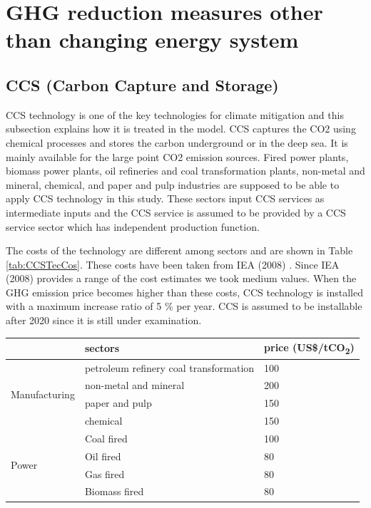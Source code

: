 \documentclass[10pt,a4paper,titlepage,dvipdfmx]{book}
\begin{document}
\section{\label{sec:GHGRedMeaOthThanCHaEneSys}{GHG reduction measures other than changing energy system}}

\subsection{\label{subsec:CCS}{CCS (Carbon Capture and Storage)}}

CCS technology is one of the key technologies for climate mitigation and this subsection explains how it is treated in the model. CCS captures the CO2 using chemical processes and stores the carbon underground or in the deep sea. It is mainly available for the large point CO2 emission sources. Fired power plants, biomass power plants, oil refineries and coal transformation plants, non-metal and mineral, chemical, and paper and pulp industries are supposed to be able to apply CCS technology in this study. These sectors input CCS services as intermediate inputs and the CCS service is assumed to be provided by a CCS service sector which has independent production function.

The costs of the technology are different among sectors and are shown in Table \ref{tab:CCSTecCos}. These costs have been taken from IEA (2008) \cite{RN2115}. Since IEA (2008)\cite{RN2115} provides a range of the cost estimates we took medium values. When the GHG emission price becomes higher than these costs, CCS technology is installed with a maximum increase ratio of 5 \% per year. CCS is assumed to be installable after 2020 since it is still under examination.


\begin{tabularx}{\textwidth}{|
p{}|
p{}|
p{}|} 
\caption{\label{tab:CCSTecCos}CCS technology cost}\\
\hline 
 & sectors & price (US\$/tCO\textsubscript{2}) \\\hline 
\multirow{4}{=}{Manufacturing}  & petroleum refinery coal transformation & 100 \\\cline{2-3}
 & non-metal and mineral & 200 \\\cline{2-3}
 & paper and pulp & 150 \\\cline{2-3}
 & chemical & 150 \\\hline 
\multirow{4}{=}{Power}  & Coal fired & 100 \\\cline{2-3}
 & Oil fired & 80 \\\cline{2-3}
 & Gas fired  & 80 \\\cline{2-3}
 & Biomass fired & 80 \\\hline 
\end{tabularx}
\end{document}
